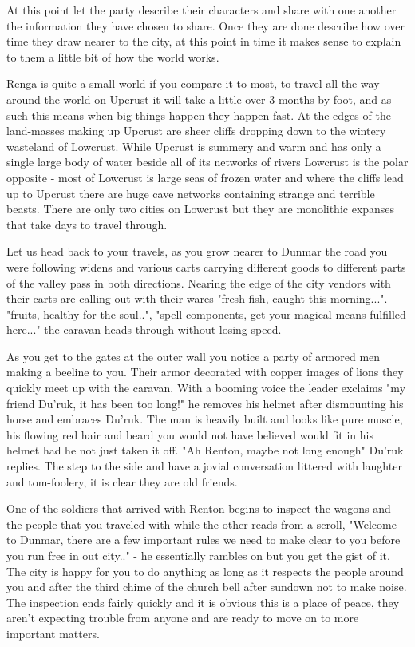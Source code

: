 \documentclass[10pt,twoside,twocolumn]{article}
\begin{document}
At this point let the party describe their characters and share with one another the information they have chosen to share. Once they are done describe how over time they draw nearer to the city, at this point in time it makes sense to explain to them a little bit of how the world works.

\begin{quotebox}
Renga is quite a small world if you compare it to most, to travel all the way around the world on Upcrust it will take a little over 3 months by foot, and as such this means when big things happen they happen fast. At the edges of the land-masses making up Upcrust are sheer cliffs dropping down to the wintery wasteland of Lowcrust. While Upcrust is summery and warm and has only a single large body of water beside all of its networks of rivers Lowcrust is the polar opposite - most of Lowcrust is large seas of frozen water and where the cliffs lead up to Upcrust there are huge cave networks containing strange and terrible beasts. There are only two cities on Lowcrust but they are monolithic expanses that take days to travel through.

Let us head back to your travels, as you grow nearer to Dunmar the road you were following widens and various carts carrying different goods to different parts of the valley pass in both directions. Nearing the edge of the city vendors with their carts are calling out with their wares "fresh fish, caught this morning...". "fruits, healthy for the soul..", "spell components, get your magical means fulfilled here..." the caravan heads through without losing speed.

As you get to the gates at the outer wall you notice a party of armored men making a beeline to you. Their armor decorated with copper images of lions they quickly meet up with the caravan. With a booming voice the leader exclaims "my friend Du'ruk, it has been too long!" he removes his helmet after dismounting his horse and embraces Du'ruk. The man is heavily built and looks like pure muscle, his flowing red hair and beard you would not have believed would fit in his helmet had he not just taken it off. "Ah Renton, maybe not long enough" Du'ruk replies. The step to the side and have a jovial conversation littered with laughter and tom-foolery, it is clear they are old friends.

One of the soldiers that arrived with Renton begins to inspect the wagons and the people that you traveled with while the other reads from a scroll, "Welcome to Dunmar, there are a few important rules we need to make clear to you before you run free in out city.." - he essentially rambles on but you get the gist of it. The city is happy for you to do anything as long as it respects the people around you and after the third chime of the church bell after sundown not to make noise. The inspection ends fairly quickly and it is obvious this is a place of peace, they aren't expecting trouble from anyone and are ready to move on to more important matters.


\end{quotebox}
\end{document}
